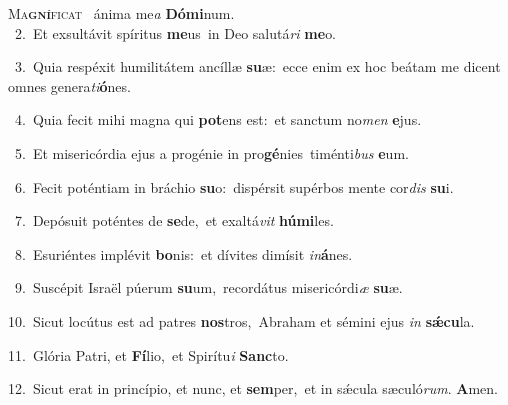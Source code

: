 \lettrine{\initial\textcolor{\initialcolor}{M}}{a\-\textbf{gní}\-ficat~\star} ánima me\textit{a} \textbf{Dó}\-\textbf{mi}num.\\
{\numbfont\textcolor{\numbcolor}{~2.}}~Et exsultávit spíritus \textbf{me}\-us~\star in Deo salutá\textit{ri} \textbf{me}\-o.\par
{\numbfont\textcolor{\numbcolor}{~3.}}~Quia respéxit humilitátem ancíllæ \textbf{su}\-æ:~\star ecce enim ex hoc beátam me dicent omnes genera\-\textit{ti}\-\textbf{ó}nes.\par
{\numbfont\textcolor{\numbcolor}{~4.}}~Quia fecit mihi magna qui \textbf{pot}\-ens est:~\star et sanctum no\textit{men} \textbf{e}\-jus.\par
{\numbfont\textcolor{\numbcolor}{~5.}}~Et misericórdia ejus a progénie in pro\-\textbf{gé}\-nies~\star timénti\textit{bus} \textbf{e}\-um.\par
{\numbfont\textcolor{\numbcolor}{~6.}}~Fecit poténtiam in bráchio \textbf{su}\-o:~\star dispérsit supérbos mente cor\textit{dis} \textbf{su}\-i.\par
{\numbfont\textcolor{\numbcolor}{~7.}}~Depósuit poténtes de \textbf{se}\-de,~\star et exaltá\textit{vit} \textbf{hú}\-\textbf{mi}les.\par
{\numbfont\textcolor{\numbcolor}{~8.}}~Esuriéntes implévit \textbf{bo}\-nis:~\star et dívites dimísit \textit{in}\-\textbf{á}nes.\par
{\numbfont\textcolor{\numbcolor}{~9.}}~Suscépit Israël púerum \textbf{su}\-um,~\star recordátus misericórdi\textit{æ} \textbf{su}\-æ.\par
{\numbfont\textcolor{\numbcolor}{10.}}~Sicut locútus est ad patres \textbf{nos}\-tros,~\star Abraham et sémini ejus \textit{in} \textbf{sǽ}\-\textbf{cu}la.\par
{\numbfont\textcolor{\numbcolor}{11.}}~Glória Patri, et \textbf{Fí}\-lio,~\star et Spirítu\textit{i} \textbf{Sanc}\-to.\par
{\numbfont\textcolor{\numbcolor}{12.}}~Sicut erat in princípio, et nunc, et \textbf{sem}\-per,~\star et in sǽcula sæculó\-\textit{rum}\-. \textbf{A}\-men.\par
